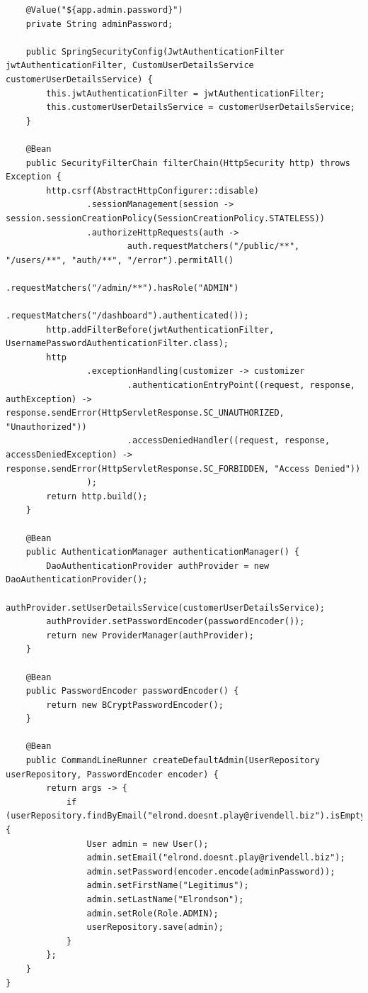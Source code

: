 \begin{lstlisting}
    @Value("${app.admin.password}")
    private String adminPassword;

    public SpringSecurityConfig(JwtAuthenticationFilter jwtAuthenticationFilter, CustomUserDetailsService customerUserDetailsService) {
        this.jwtAuthenticationFilter = jwtAuthenticationFilter;
        this.customerUserDetailsService = customerUserDetailsService;
    }

    @Bean
    public SecurityFilterChain filterChain(HttpSecurity http) throws Exception {
        http.csrf(AbstractHttpConfigurer::disable)
                .sessionManagement(session -> session.sessionCreationPolicy(SessionCreationPolicy.STATELESS))
                .authorizeHttpRequests(auth ->
                        auth.requestMatchers("/public/**", "/users/**", "auth/**", "/error").permitAll()
                                .requestMatchers("/admin/**").hasRole("ADMIN")
                                .requestMatchers("/dashboard").authenticated());
        http.addFilterBefore(jwtAuthenticationFilter, UsernamePasswordAuthenticationFilter.class);
        http
                .exceptionHandling(customizer -> customizer
                        .authenticationEntryPoint((request, response, authException) -> response.sendError(HttpServletResponse.SC_UNAUTHORIZED, "Unauthorized"))
                        .accessDeniedHandler((request, response, accessDeniedException) -> response.sendError(HttpServletResponse.SC_FORBIDDEN, "Access Denied"))
                );
        return http.build();
    }

    @Bean
    public AuthenticationManager authenticationManager() {
        DaoAuthenticationProvider authProvider = new DaoAuthenticationProvider();
        authProvider.setUserDetailsService(customerUserDetailsService);
        authProvider.setPasswordEncoder(passwordEncoder());
        return new ProviderManager(authProvider);
    }

    @Bean
    public PasswordEncoder passwordEncoder() {
        return new BCryptPasswordEncoder();
    }

    @Bean
    public CommandLineRunner createDefaultAdmin(UserRepository userRepository, PasswordEncoder encoder) {
        return args -> {
            if (userRepository.findByEmail("elrond.doesnt.play@rivendell.biz").isEmpty()) {
                User admin = new User();
                admin.setEmail("elrond.doesnt.play@rivendell.biz");
                admin.setPassword(encoder.encode(adminPassword));
                admin.setFirstName("Legitimus");
                admin.setLastName("Elrondson");
                admin.setRole(Role.ADMIN);
                userRepository.save(admin);
            }
        };
    }
}
\end{lstlisting}

